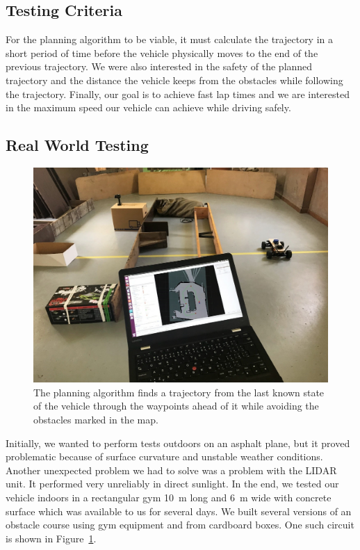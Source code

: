 \subsection{Testing Criteria}
For the planning algorithm to be viable, it must calculate the trajectory in a short period of time before the vehicle physically moves to the end of the previous trajectory. We were also interested in the safety of the planned trajectory and the distance the vehicle keeps from the obstacles while following the trajectory. Finally, our goal is to achieve fast lap times and we are interested in the maximum speed our vehicle can achieve while driving safely.

\subsection{Real World Testing}

\begin{figure}
	\centering
	\includegraphics[width=\textwidth]{../img/experiments/real-world-still.jpg}
	\caption{The planning algorithm finds a trajectory from the last known state of the vehicle through the waypoints ahead of it while avoiding the obstacles marked in the map.}
	\label{fig:real-world-testing-still}
\end{figure}


Initially, we wanted to perform tests outdoors on an asphalt plane, but it proved problematic because of surface curvature and unstable weather conditions. Another unexpected problem we had to solve was a problem with the \gls*{LIDAR} unit. It performed very unreliably in direct sunlight. In the end, we tested our vehicle indoors in a rectangular gym \SI{10}{\meter} long and \SI{6}{\meter} wide with concrete surface which was available to us for several days. We built several versions of an obstacle course using gym equipment and from cardboard boxes. One such circuit is shown in Figure~\ref{fig:real-world-testing-still}.

